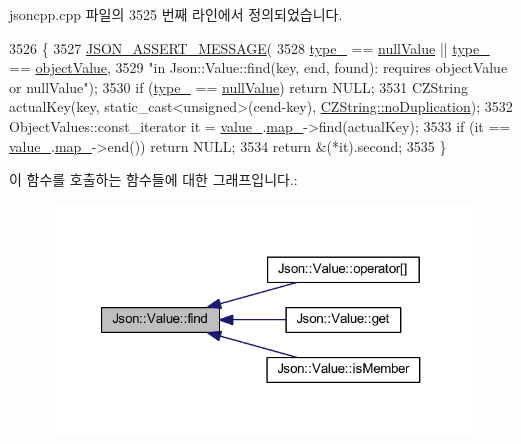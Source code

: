 jsoncpp.\+cpp 파일의 3525 번째 라인에서 정의되었습니다.


\begin{DoxyCode}
3526 \{
3527   \hyperlink{json_8h_ad7facdeeca0f495765e3b204c265eadb}{JSON\_ASSERT\_MESSAGE}(
3528       \hyperlink{class_json_1_1_value_abd222c2536dc88bf330dedcd076d2356}{type\_} == \hyperlink{namespace_json_a7d654b75c16a57007925868e38212b4ea7d9899633b4409bd3fc107e6737f8391}{nullValue} || \hyperlink{class_json_1_1_value_abd222c2536dc88bf330dedcd076d2356}{type\_} == \hyperlink{namespace_json_a7d654b75c16a57007925868e38212b4eae8386dcfc36d1ae897745f7b4f77a1f6}{objectValue},
3529       \textcolor{stringliteral}{"in Json::Value::find(key, end, found): requires objectValue or nullValue"});
3530   \textcolor{keywordflow}{if} (\hyperlink{class_json_1_1_value_abd222c2536dc88bf330dedcd076d2356}{type\_} == \hyperlink{namespace_json_a7d654b75c16a57007925868e38212b4ea7d9899633b4409bd3fc107e6737f8391}{nullValue}) \textcolor{keywordflow}{return} NULL;
3531   CZString actualKey(key, static\_cast<unsigned>(cend-key), 
      \hyperlink{class_json_1_1_value_1_1_c_z_string_a2805c46fb4a72bbaed55de6d75941b6da08d540450fa6c4af57eaacf063eedd20}{CZString::noDuplication});
3532   ObjectValues::const\_iterator it = \hyperlink{class_json_1_1_value_aef578244546212705b9f81eb84d7e151}{value\_}.\hyperlink{union_json_1_1_value_1_1_value_holder_a1e7a5b86d4f52234f55c847ad1ce389a}{map\_}->find(actualKey);
3533   \textcolor{keywordflow}{if} (it == \hyperlink{class_json_1_1_value_aef578244546212705b9f81eb84d7e151}{value\_}.\hyperlink{union_json_1_1_value_1_1_value_holder_a1e7a5b86d4f52234f55c847ad1ce389a}{map\_}->end()) \textcolor{keywordflow}{return} NULL;
3534   \textcolor{keywordflow}{return} &(*it).second;
3535 \}
\end{DoxyCode}
이 함수를 호출하는 함수들에 대한 그래프입니다.\+:
\nopagebreak
\begin{figure}[H]
\begin{center}
\leavevmode
\includegraphics[width=321pt]{class_json_1_1_value_afb007b9ce9b2cf9d5f667a07e5e0349f_icgraph}
\end{center}
\end{figure}
\mbox{\label{class_json_1_1_value_a034eb7bf85a44fa759bdaa232788ca66}} 
